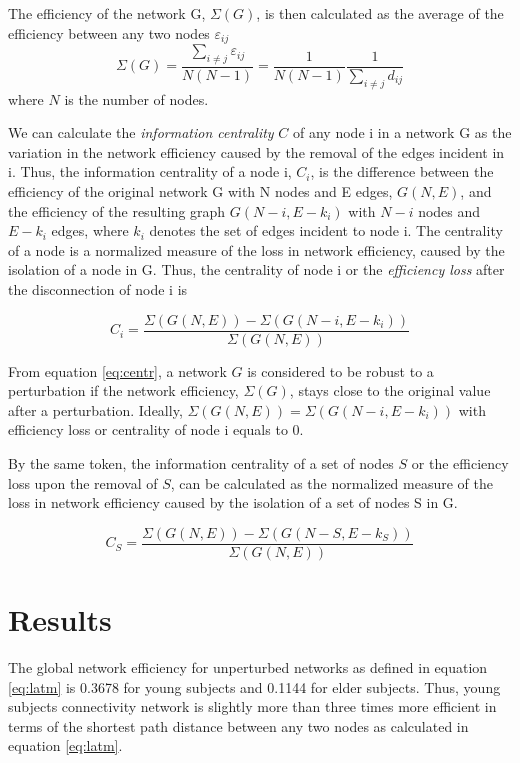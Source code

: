 \documentclass[12pt,a4paper]{article}
\begin{document}
The efficiency of the network G, $\Sigma(G)$, is then calculated as the average of the efficiency
between any two nodes $\varepsilon_{ij}$ 
\begin{equation}
\Sigma(G)=\frac{\sum_{i \neq j} \varepsilon_{ij}} {N(N-1)}
=\frac{1}{N(N-1)}\frac{1}{\sum_{i \neq j } d_{ij}}
\label{eq:latm}
\end{equation}
where $N$ is the number of nodes. 
 
We can calculate
the  \emph{information centrality} $C$ 
of any node i in a network G as the variation
in the network efficiency caused by the removal of the edges incident in i. Thus, the
information centrality of a node i, $C_i$, is the difference between the
efficiency of the original network G with N nodes and E edges, $G(N,E)$, and the
efficiency of the resulting graph $G(N-i,E-k_i)$ with $N-i$ nodes and $E-k_i$ edges, where
$k_i$ denotes the set of edges incident to node i. The centrality of a
node is a normalized measure of the loss in network efficiency, caused by the isolation of a node in G. Thus, the centrality of node i or the \emph{efficiency loss} after the disconnection of node i is

\begin{equation}
C_i=\frac {\Sigma(G(N,E)) - \Sigma(G(N-i,E-k_i))} {\Sigma(G(N,E))} 
\label{eq:centr}
\end{equation}

From equation \ref{eq:centr}, a network $G$ is considered to be robust to
a perturbation if the network efficiency, $\Sigma(G)$, 
stays close to the original value after a perturbation. Ideally, $\Sigma(G(N,E)) = \Sigma(G(N -i,E-k_i))$
with efficiency loss or centrality of node i equals to 0.

By the same token, the information centrality of a set of nodes $S$ or the efficiency loss upon the removal of $S$, can be calculated as the normalized measure of the loss in network efficiency caused by the isolation of a set of nodes S in G.

\begin{equation}
C_S=\frac {\Sigma(G(N,E)) - \Sigma(G(N-S,E-k_S)) } {\Sigma(G(N,E))} 
\label{eq:centrS}
\end{equation}

\section{Results}
\label{results}

 The global network efficiency for unperturbed networks as defined in equation \ref{eq:latm} is
 0.3678 for young subjects and 0.1144 for elder subjects. Thus, young subjects connectivity network is slightly more than three times more efficient in terms of the shortest path distance between any two nodes as calculated in equation \ref{eq:latm}.
\end{document}
